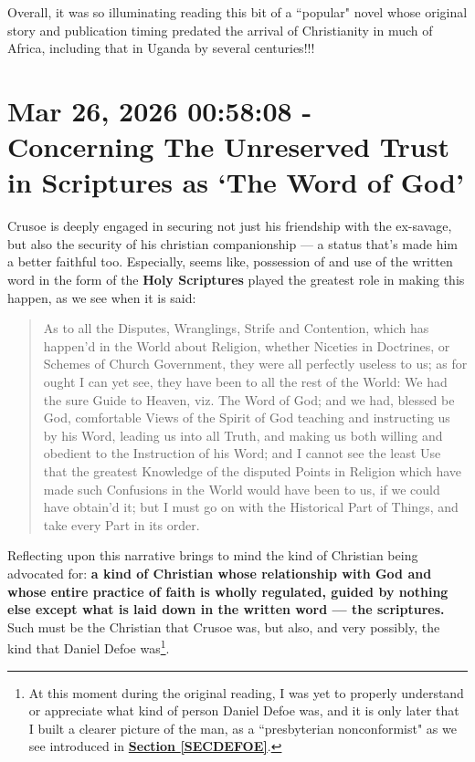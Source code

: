 \documentclass[a4paper]{article}
\begin{document}
Overall, it was so illuminating reading this bit of a ``popular" novel whose original story and publication timing predated the arrival of Christianity in much of Africa, including that in Uganda by several centuries!!!







\section{Mar 26, 2026 00:58:08 - Concerning The Unreserved Trust in Scriptures as `The Word of God'}
\label{SEC59}

Crusoe is deeply engaged in securing not just his friendship with the ex-savage, but also the security of his christian companionship --- a status that's made him a better faithful too. Especially, seems like, possession of and use of the written word in the form of the \textbf{Holy Scriptures} played the greatest role in making this happen, as we see when it is said:


\noindent
\begin{minipage}{1\textwidth}
\vspace{1em}
\begin{quotation}
{\ttfamily


As to all the Disputes, Wranglings, Strife and Contention, which has happen’d in the World about Religion, whether Niceties in Doctrines, or Schemes of Church Government, they were all perfectly useless to us; as for ought I can yet see, they have been to all the rest of the World: We had the sure Guide to Heaven, viz. The Word of God; and we had, blessed be God, comfortable Views of the Spirit of God teaching and instructing us by his Word, leading us into all Truth, and making us both willing and obedient to the Instruction of his Word; and I cannot see the least Use that the greatest Knowledge of the disputed Points in Religion which have made such Confusions in the World would have been to us, if we could have obtain’d it; but I must go on with the Historical Part of Things, and take every Part in its order.


}
\end{quotation}
\vspace{1em}
\end{minipage}


Reflecting upon this narrative brings to mind the kind of Christian being advocated for: \textbf{a kind of Christian whose relationship with God and whose entire practice of faith is wholly regulated, guided by nothing else except what is laid down in the written word --- the scriptures.} Such must be the Christian that Crusoe was, but also, and very possibly, the kind that Daniel Defoe was\footnote{At this moment during the original reading, I was yet to properly understand or appreciate what kind of person Daniel Defoe was, and it is only later that I built a clearer picture of the man, as a ``presbyterian nonconformist" as we see introduced in \textbf{\hyperref[SECDEFOE]{Section \ref{SECDEFOE}}}.}.
\end{document}
